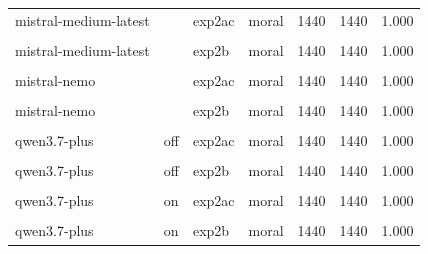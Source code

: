 \documentclass[
]{article}
\begin{document}
\begin{table}[!h]
{\begin{tabular}[t]{llllrrr}
mistral-medium-latest &  & exp2ac & moral & 1440 & 1440 & 1.000\\
\cellcolor{gray!10}{mistral-medium-latest} & \cellcolor{gray!10}{} & \cellcolor{gray!10}{exp2b} & \cellcolor{gray!10}{economic} & \cellcolor{gray!10}{1440} & \cellcolor{gray!10}{1440} & \cellcolor{gray!10}{1.000}\\
mistral-medium-latest &  & exp2b & moral & 1440 & 1440 & 1.000\\
\addlinespace
\cellcolor{gray!10}{mistral-nemo} & \cellcolor{gray!10}{} & \cellcolor{gray!10}{exp2ac} & \cellcolor{gray!10}{economic} & \cellcolor{gray!10}{1440} & \cellcolor{gray!10}{1440} & \cellcolor{gray!10}{1.000}\\
mistral-nemo &  & exp2ac & moral & 1440 & 1440 & 1.000\\
\cellcolor{gray!10}{mistral-nemo} & \cellcolor{gray!10}{} & \cellcolor{gray!10}{exp2b} & \cellcolor{gray!10}{economic} & \cellcolor{gray!10}{1440} & \cellcolor{gray!10}{1440} & \cellcolor{gray!10}{1.000}\\
mistral-nemo &  & exp2b & moral & 1440 & 1440 & 1.000\\
\cellcolor{gray!10}{qwen3.7-plus} & \cellcolor{gray!10}{off} & \cellcolor{gray!10}{exp2ac} & \cellcolor{gray!10}{economic} & \cellcolor{gray!10}{1440} & \cellcolor{gray!10}{1440} & \cellcolor{gray!10}{1.000}\\
\addlinespace
qwen3.7-plus & off & exp2ac & moral & 1440 & 1440 & 1.000\\
\cellcolor{gray!10}{qwen3.7-plus} & \cellcolor{gray!10}{off} & \cellcolor{gray!10}{exp2b} & \cellcolor{gray!10}{economic} & \cellcolor{gray!10}{1440} & \cellcolor{gray!10}{1440} & \cellcolor{gray!10}{1.000}\\
qwen3.7-plus & off & exp2b & moral & 1440 & 1440 & 1.000\\
\cellcolor{gray!10}{qwen3.7-plus} & \cellcolor{gray!10}{on} & \cellcolor{gray!10}{exp2ac} & \cellcolor{gray!10}{economic} & \cellcolor{gray!10}{1440} & \cellcolor{gray!10}{1440} & \cellcolor{gray!10}{1.000}\\
qwen3.7-plus & on & exp2ac & moral & 1440 & 1440 & 1.000\\
\addlinespace
\cellcolor{gray!10}{qwen3.7-plus} & \cellcolor{gray!10}{on} & \cellcolor{gray!10}{exp2b} & \cellcolor{gray!10}{economic} & \cellcolor{gray!10}{1440} & \cellcolor{gray!10}{1440} & \cellcolor{gray!10}{1.000}\\
qwen3.7-plus & on & exp2b & moral & 1440 & 1440 & 1.000\\
\bottomrule
\end{tabular}}
\end{table}
\end{document}
